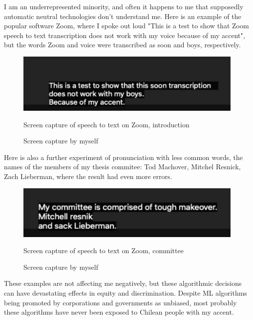 I am an underrepresented minority, and often it happens to me that supposedly automatic neutral technologies don't understand me. Here is an example of the popular software Zoom, where I spoke out loud "This is a test to show that Zoom speech to text transcription does not work with my voice because of my accent", but the words Zoom and voice were transcribed as soon and boys, respectively.

\begin{figure}[ht]
  \centering
  \includegraphics[width=0.75\linewidth,height=0.25\textheight,keepaspectratio]{images/zoom-introduction.jpg}
  \caption{Screen capture of speech to text on Zoom, introduction}
  \caption*{Screen capture by myself}
  \label{fig:zoom-voice}
\end{figure}

Here is also a further experiment of pronunciation with less common words, the names of the members of my thesis commitee: Tod Machover, Mitchel Resnick, Zach Lieberman, where the result had even more errors.

\begin{figure}[ht]
  \centering
  \includegraphics[width=0.75\linewidth,height=0.25\textheight,keepaspectratio]{images/zoom-commitee.jpg}
  \caption{Screen capture of speech to text on Zoom, committee}
  \caption*{Screen capture by myself}
  \label{fig:zoom-committee}
\end{figure}

These examples are not affecting me negatively, but these algorithmic decisions can have devastating effects in equity and discrimination.  Despite \acrshort{ML} algorithms being promoted by corporations and governments as unbiased, most probably these algorithms have never been exposed to Chilean people with my accent.

